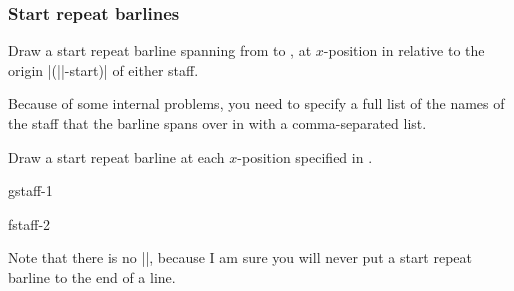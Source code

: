 \subsubsection{Start repeat barlines}\label{sec:multistaff:barlines:start}
\begin{command}{\tmstartrepeatbarline{}}
  Draw a start repeat barline spanning from  to 
  , at $x$-position  in relative to 
  the origin |(||-start)| of either staff.

  Because of some internal problems, you need to specify a full list of the names 
  of the staff that the barline spans over in  with 
  a comma-separated list.
\end{command}
\begin{command}{\tmstartrepeatbarlineinline{}}
  Draw a start repeat barline at each $x$-position specified in .
\end{command}
\begin{codeexample}[]
\begin{tmline}%
\begin{tmstaff}{g}{staff-1}\end{tmstaff}%
\begin{tmstaff}{f}{staff-2}
\end{tmstaff}%
%
%
%
\end{tmline}
\end{codeexample}
Note that there is no |\tmstartrepeatbarlineendline|, because I am sure you 
will never put a start repeat barline to the end of a line.
